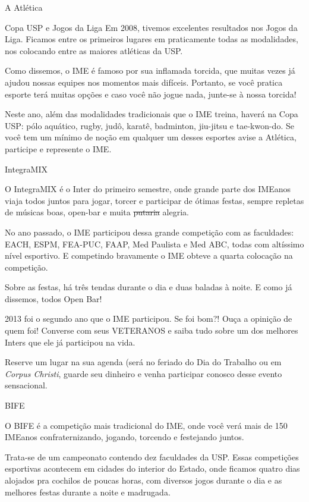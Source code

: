 \begin{secao}{A Atlética}
\begin{subsecao}{Copa USP e Jogos da Liga}
Em 2008, tivemos excelentes resultados nos Jogos da Liga. Ficamos entre os
primeiros lugares em praticamente todas as modalidades, nos colocando entre as
maiores atléticas da USP.

Como dissemos, o IME é famoso por sua inflamada torcida, que muitas vezes já
ajudou nossas equipes nos momentos mais difíceis. Portanto, se você pratica
esporte terá muitas opções e caso você não jogue nada, junte-se à nossa torcida!

Neste ano, além das modalidades tradicionais que o IME treina, haverá na Copa 
USP: pólo aquático, rugby, judô, karatê, badminton, jiu-jitsu e tae-kwon-do. Se 
você tem um mínimo de noção em qualquer um desses esportes avise a Atlética,
participe e represente o IME.

\end{subsecao}
\begin{subsecao}{IntegraMIX}

O IntegraMIX é o Inter do primeiro semestre, onde grande parte dos IMEanos
viaja todos juntos para jogar, torcer e participar de ótimas festas, sempre
repletas de músicas boas, open-bar e muita \sout{putaria} alegria.

No ano passado, o IME participou dessa grande competição com as faculdades:
EACH, ESPM, FEA-PUC, FAAP, Med Paulista e Med ABC, todas com altíssimo nível
esportivo. E competindo bravamente o IME obteve a quarta colocação na
competição.

Sobre as festas, há três tendas durante o dia e duas baladas à noite.
E como já dissemos, todos Open Bar!

2013 foi o segundo ano que o IME participou. Se foi bom?! Ouça a opinição de 
quem foi! Converse com seus VETERANOS e saiba tudo sobre um dos melhores Inters
que ele já participou na vida.

Reserve um lugar na sua agenda (será no feriado do Dia do Trabalho ou em
{\it Corpus Christi}, guarde seu dinheiro e venha participar conosco 
desse evento sensacional.


\end{subsecao}
\begin{subsecao}{BIFE}

O BIFE é a competição mais tradicional do IME, onde você verá mais de 150 
IMEanos confraternizando, jogando, torcendo e festejando juntos.

Trata-se de um campeonato contendo dez faculdades da USP. Essas competições
esportivas acontecem em cidades do interior do Estado, onde ficamos quatro dias
alojados pra cochilos de poucas horas, com diversos jogos durante o dia e as
melhores festas durante a noite e madrugada.


\end{subsecao}
\end{secao}
